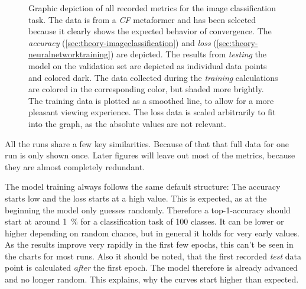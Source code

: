 \begin{figure}[htbp]
    \centering
    \caption{Graphic depiction of all recorded metrics for the image classification task.
    The data is from a \emph{CF} metaformer and has been selected because it clearly shows the expected behavior of convergence.
    The \emph{accuracy} (\autoref{sec:theory-imageclassification}) and \emph{loss} (\autoref{sec:theory-neuralnetworktraining}) are depicted. 
    The results from \emph{testing} the model on the validation set are depicted as individual data points and colored dark. 
    The data collected during the \emph{training} calculations are colored in the corresponding color, but shaded more brightly. The training data is plotted as a smoothed line, to allow for a more pleasant viewing experience.
    The loss data is scaled arbitrarily to fit into the graph, as the absolute values are not relevant. }
    \label{fig:comparison-recorded-values}
\end{figure}

All the runs share a few key similarities. Because of that that full data for one run is only shown once. 
Later figures will leave out most of the metrics, because they are almost completely redundant.

The model training always follows the same default structure: The accuracy starts low and the loss starts at a high value.
This is expected, as at the beginning the model only guesses randomly. 
Therefore a top-1-accuracy should start at around \SI[]{1}[]{\percent} for a classification task of 100 classes.
It can be lower or higher depending on random chance, but in general it holds for very early values. 
As the results improve very rapidly in the first few epochs, this can't be seen in the charts for most runs.
Also it should be noted, that the first recorded \emph{test} data point is calculated \emph{after} the first epoch. 
The model therefore is already advanced and no longer random. 
This explains, why the curves start higher than expected.

